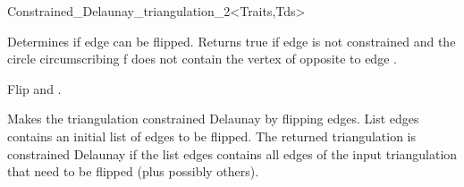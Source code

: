 \begin{ccRefClass}{Constrained_Delaunay_triangulation_2<Traits,Tds>}
\begin{ccAdvanced}

{ Determines if edge  can be flipped. Returns true if
edge  is not constrained and  the circle circumscribing f
does not contain the vertex of 
opposite to edge . }

{ Flip  and .}


{ Makes the triangulation constrained Delaunay by flipping edges. 
List edges contains an
initial list of edges to be flipped. The returned
triangulation is constrained Delaunay 
if the list edges contains all edges of the
input triangulation that need to be flipped (plus possibly others). }
\end{ccAdvanced}


\ccSeeAlso
{} \\
 \\
 \\

\ccExample




\end{ccRefClass}


